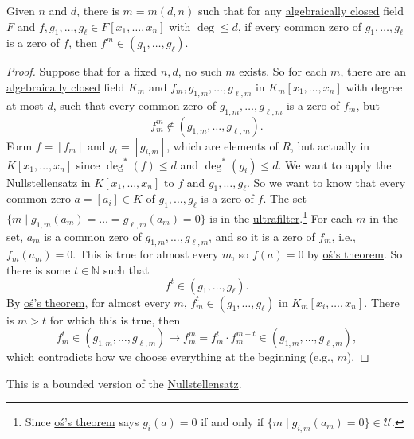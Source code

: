 \begin{theorem}
	Given \(n\) and \(d\), there is \(m=m(d, n)\) such that for any \hyperref[def:algebraically-closed]{algebraically closed} field \(F\) and \(f, g_1, \dots , g_{\ell }\in F[x_1, \dots , x_n]\) with \(\deg \leq d\), if every common zero of \(g_1, \dots , g_{\ell }\) is a zero of \(f\), then \(f^m \in (g_1, \dots , g_{\ell })\).
\end{theorem}
\begin{proof}
	Suppose that for a fixed \(n, d\), no such \(m\) exists. So for each \(m\), there are an \hyperref[def:algebraically-closed]{algebraically closed} field \(K_m\) and \(f_m, g_{1, m}, \dots , g_{\ell , m}\) in \(K_m[x_1, \dots , x_n]\) with degree at most \(d\), such that every common zero of \(g_{1, m}, \dots , g_{\ell , m}\) is a zero of \(f_m\), but
	\[
		f^m_m \notin (g_{1, m} , \dots , g_{\ell , m}).
	\]
	Form \(f = [f_m]\) and \(g_i = [g_{i, m}]\), which are elements of \(R\), but actually in \(K[x_1, \dots , x_n]\) since \(\deg^{\ast} (f) \leq d\) and \(\deg^{\ast} (g_i) \leq d\). We want to apply the \hyperref[thm:Hilbert-Nullstellensatz]{Nullstellensatz} in \(K[x_1, \dots , x_n]\) to \(f\) and \(g_1, \dots , g_{\ell } \). So we want to know that every common zero \(a=[a_i] \in K\) of \(g_1, \dots , g_{\ell } \) is a zero of \(f\). The set \(\{ m \mid g_{1,m} (a_m)= \dots = g_{\ell , m} (a_m) = 0\} \) is in the \hyperref[def:ultrafilter]{ultrafilter}.\footnote{Since \hyperref[thm:Los]{oś's theorem} says \(g_i(a)= 0\) if and only if \(\{ m \mid g_{i, m}(a_m) = 0 \} \in \mathcal{U}\).} For each \(m\) in the set, \(a_m\) is a common zero of \(g_{1, m}, \dots , g_{\ell , m}\), and so it is a zero of \(f_m\), i.e., \(f_m(a_m) = 0\). This is true for almost every \(m\), so \(f(a)=0\) by \hyperref[thm:Los]{oś's theorem}. So there is some \(t\in \mathbb{N} \) such that
	\[
		f^t \in (g_1, \dots , g_{\ell } ).
	\]
	By \hyperref[thm:Los]{oś's theorem}, for almost every \(m\), \(f_m^t\in (g_1, \dots , g_{\ell } )\) in \(K_m[x_i, \dots , x_n]\). There is \(m > t\) for which this is true, then
	\[
		f_m^t\in (g_{1, m}, \dots , g_{\ell , m}) \to f_m^m = f_m^t \cdot f_m^{m-t} \in (g_{1, m}, \dots , g_{\ell , m}),
	\]
	which contradicts how we choose everything at the beginning (e.g., \(m\)).
\end{proof}

\begin{intuition}
	This is a bounded version of the \hyperref[thm:Hilbert-Nullstellensatz]{Nullstellensatz}.
\end{intuition}

